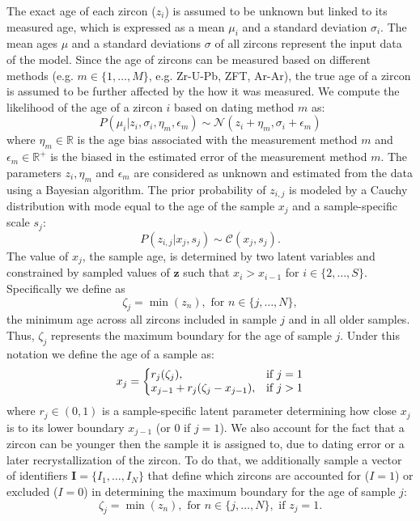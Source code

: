 \documentclass[12pt,letterpaper]{article}
\begin{document}
The exact age of each zircon ($z_i$) is assumed to be unknown but linked to its measured age, which is expressed as a mean $\mu_i$ and a standard deviation $\sigma_i$.
The mean ages $\mu$ and a standard deviations $\sigma$ of all zircons represent the input data of the model.
Since the age of zircons can be measured based on different methods (e.g. $m \in \{1, \dots, M \}$, e.g. Zr-U-Pb, ZFT, Ar-Ar), the true age of a zircon is assumed to be further affected by the how it was measured. We compute the likelihood of the age of a zircon $i$ based on dating method $m$ as:
\begin{equation}
P(\mu_i | z_i, \sigma_i, \eta_m, \epsilon_m) \sim \mathcal{N}(z_i + \eta_m, \sigma_i + \epsilon_m)   
\end{equation}
where $\eta_m \in \mathbb{R}$ is the age bias associated with the measurement method $m$ and $\epsilon_m \in \mathbb{R^+}$ is the biased in the estimated error of the measurement method $m$.
The parameters  $z_i, \eta_m$ and $\epsilon_m$ are considered as unknown and estimated from the data using a Bayesian algorithm.
The prior probability of $z_{i,j}$ is modeled by a Cauchy distribution with mode equal to the age of the sample $x_j$ and a sample-specific scale $s_j$:
\begin{equation}
P(z_{i,j} | x_j, s_j) \sim \mathcal{C}(x_j, s_j).
\end{equation}
The value of $x_j$, the sample age, is determined by two latent variables and constrained by sampled values of $\mathbf{z}$ such that $x_{i} > x_{i - 1}$ for $i \in \{2, \dots, S\}$.
Specifically we define as 
\begin{equation}
\zeta_j = \min(z_{n}), \text{ for } n \in \{j, \dots, N\},
\end{equation}
the minimum age across all zircons included in sample $j$ and in all older samples. 
Thus, $\zeta_j$ represents the maximum boundary for the age of sample $j$.
Under this notation we define the age of a sample as: 
\begin{equation}
x_j = \left\{
\begin{array}{@{}ll@{}}
    r_j (\zeta_j), & \text{if}\ j = 1 \\
    x_{j - 1} + r_j (\zeta_j - x_{j - 1}), & \text{if}\ j > 1 \\
\end{array}\right.
\end{equation}
where $r_j \in (0, 1)$ is a sample-specific latent parameter determining how close $x_{j}$ is to its lower boundary $x_{j - 1}$ (or 0 if $j = 1$). 
%
We also account for the fact that a zircon can be younger then the sample it is assigned to, due to dating error or a later recrystallization of the zircon. 
To do that, we additionally sample a vector of identifiers $\mathbf{I} = \{I_1, \dots, I_N\}$ that define which zircons are accounted for ($I = 1$) or excluded ($I = 0$) in determining the maximum boundary for the age of sample $j$:
\begin{equation}
\zeta_j = \min(z_{n}), \text{ for } n \in \{j, \dots, N \}, \text{ if } z_j = 1.
\end{equation}
\end{document}
